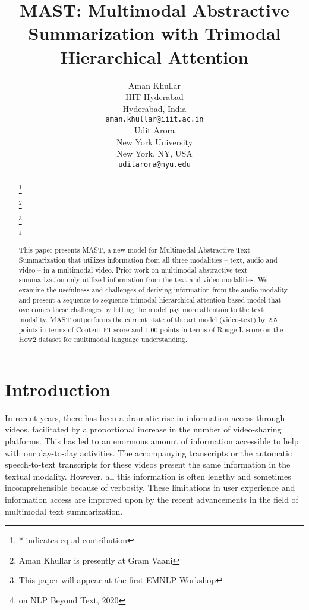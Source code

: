 \documentclass[11pt,a4paper]{article}
\title{MAST: Multimodal Abstractive Summarization with Trimodal Hierarchical Attention}
\author{Aman Khullar \\
  IIIT Hyderabad \\
  Hyderabad, India \\
  {\tt aman.khullar@iiit.ac.in} \\\And
  Udit Arora \\
  New York University \\
  New York, NY, USA \\
  {\tt uditarora@nyu.edu} \\}
\date{}
\newcommand\blfootnote[1]{\begingroup
  \renewcommand\thefootnote{}\footnote{#1}\addtocounter{footnote}{-1}\endgroup
}
\begin{document}
\maketitle



\begin{abstract}
  \blfootnote{* indicates equal contribution}
  \blfootnote{Aman Khullar is presently at Gram Vaani}
  \blfootnote{This paper will appear at the first EMNLP Workshop}\blfootnote{on NLP Beyond Text, 2020}
  This paper presents MAST, a new model for Multimodal Abstractive Text Summarization that utilizes information from all three modalities -- text, audio and video -- in a multimodal video. Prior work on multimodal abstractive text summarization only utilized information from the text and video modalities. We examine the usefulness and challenges of deriving information from the audio modality and present a sequence-to-sequence trimodal hierarchical attention-based model that overcomes these challenges by letting the model pay more attention to the text modality. MAST outperforms the current state of the art model (video-text) by 2.51 points in terms of Content F1 score and 1.00 points in terms of Rouge-L score on the How2 dataset for multimodal language understanding.
  
\end{abstract}

\section{Introduction}
In recent years, there has been a dramatic rise in information access through videos, facilitated by a proportional increase in the number of video-sharing platforms. This has led to an enormous amount of information accessible to help with our day-to-day activities. The accompanying transcripts or the automatic speech-to-text transcripts for these videos present the same information in the textual modality. However, all this information is often lengthy and sometimes incomprehensible because of verbosity. These limitations in user experience and information access are improved upon by the recent advancements in the field of multimodal text summarization.
\end{document}
